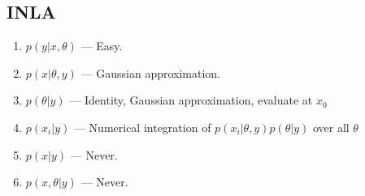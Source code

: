 \documentclass{article}
\begin{document}
\subsection*{INLA} %
\begin{enumerate}
\item $p(y|x,\theta)$ --- Easy.
\item $p(x|\theta, y)$ --- Gaussian approximation.
\item $p(\theta|y)$ --- Identity, Gaussian approximation, evaluate at $x_{0}$
\item $p(x_{i}|y)$ --- Numerical integration of $p(x_{i}|\theta, y)p(\theta |y)$ over all $\theta$
\item $p(x|y)$ --- Never.
\item $p(x,\theta | y)$ --- Never.
\end{enumerate}
\end{document}
